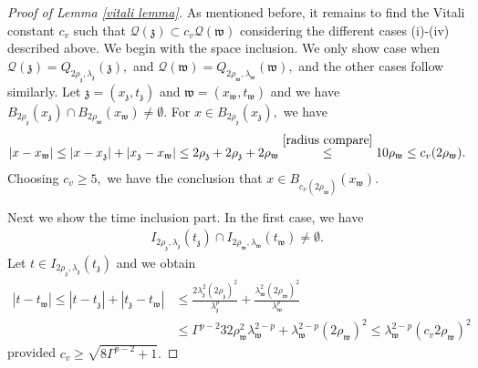 \documentclass[notitlepage,11pt,reqno]{amsart}
\theoremstyle{definition}
\numberwithin{equation}{section}
\begin{document}
\begin{proof}[Proof of Lemma \ref{vitali lemma}] As mentioned before, it remains to find the  Vitali constant $c_v$ such that $\mathcal{Q}(\mathfrak z)\subset c_v \mathcal{Q}(\mathfrak w)$ considering the different cases (i)-(iv) described above. We begin with the space inclusion.  We only show case when $\mathcal{Q}(\mathfrak z)=Q_{2\rho_{\mathfrak z}, \lambda_{\mathfrak z}}(\mathfrak z),$ and $\mathcal{Q}(\mathfrak w)=Q_{2\rho_{\mathfrak w}, \lambda_\mathfrak w}(\mathfrak w),$ and the other cases follow similarly. Let $\mathfrak{z}=(x_{\mathfrak{z}}, t_{\mathfrak{z}})$ and $\mathfrak{w}=(x_{\mathfrak{w}}, t_{\mathfrak{w}})$ and we have $B_{2\rho_{\mathfrak{z}}}(x_{\mathfrak{z}})\cap B_{2\rho_{\mathfrak{w}}}(x_{\mathfrak{w}})\neq \emptyset.$ For $x \in B_{2\rho_{\mathfrak{z}}}(x_{\mathfrak{z}}),$ we have
\begin{align*}
    |x-x_{\mathfrak{w}}|\leq |x-x_{\mathfrak{z}}|+|x_{\mathfrak{z}}-x_{\mathfrak{w}}|\leq 2\rho_{\mathfrak{z}}+2\rho_{\mathfrak{z}}+2\rho_{\mathfrak{w}}\overset{\eqref{radius compare}}{\leq} 10\rho_{\mathfrak{w}}\leq c_v (2\rho_{\mathfrak{w}}). 
\end{align*}
Choosing $c_{v}\geq 5,$ we have the conclusion that $x\in B_{c_{\nu}(2\rho_{\mathfrak{w}})}(x_{\mathfrak w}).$

Next we show the time inclusion part. In the first case, we have
\begin{align*}
    I_{2\rho_{\mathfrak{z}}, \lambda_{\mathfrak{z}}}(t_{\mathfrak{z}})\cap I_{2\rho_{\mathfrak{w}}, \lambda_{\mathfrak{w}}}(t_{\mathfrak{w}})\neq \emptyset.
\end{align*}
Let $t \in I_{2\rho_{\mathfrak z}, \lambda_{\mathfrak z}}(t_{\mathfrak z})$ and we obtain
\begin{align*}
 |t-t_{\mathfrak{w}}|\leq |t-t_{\mathfrak{z}}|+|t_{\mathfrak{z}}-t_{\mathfrak{w}}|&\leq \frac{2\lambda^{2}_{\mathfrak{z}}(2\rho_{\mathfrak{z}})^2}{\lambda^p_{\mathfrak z}}+\frac{\lambda^{2}_{\mathfrak{w}}(2\rho_{\mathfrak{w}})^2}{\lambda^p_{\mathfrak w}}\\ &\leq \Gamma^{p-2}32 \rho^2_{\mathfrak w}\lambda^{2-p}_{\mathfrak w}+\lambda^{2-p}_{\mathfrak w}(2 \rho_{\mathfrak w})^2\leq \lambda^{2-p}_{\mathfrak w}(c_v 2 \rho_{\mathfrak w})^2
\end{align*}
provided $c_v \geq \sqrt{8\Gamma^{p-2}+1}.$


\end{proof}
\end{document}
